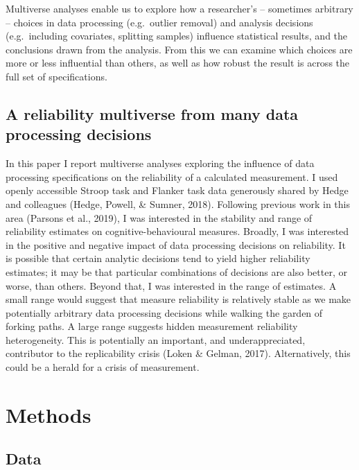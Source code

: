 \documentclass[english,man,floatsintext]{apa6}
\begin{document}
Multiverse analyses enable us to explore how a researcher's -- sometimes arbitrary -- choices in data processing (e.g.~outlier removal) and analysis decisions (e.g.~including covariates, splitting samples) influence statistical results, and the conclusions drawn from the analysis. From this we can examine which choices are more or less influential than others, as well as how robust the result is across the full set of specifications.

\hypertarget{a-reliability-multiverse-from-many-data-processing-decisions}{%
\subsection{A reliability multiverse from many data processing decisions}\label{a-reliability-multiverse-from-many-data-processing-decisions}}

In this paper I report multiverse analyses exploring the influence of data processing specifications on the reliability of a calculated measurement. I used openly accessible Stroop task and Flanker task data generously shared by Hedge and colleagues (Hedge, Powell, \& Sumner, 2018). Following previous work in this area (Parsons et al., 2019), I was interested in the stability and range of reliability estimates on cognitive-behavioural measures. Broadly, I was interested in the positive and negative impact of data processing decisions on reliability. It is possible that certain analytic decisions tend to yield higher reliability estimates; it may be that particular combinations of decisions are also better, or worse, than others. Beyond that, I was interested in the range of estimates. A small range would suggest that measure reliability is relatively stable as we make potentially arbitrary data processing decisions while walking the garden of forking paths. A large range suggests hidden measurement reliability heterogeneity. This is potentially an important, and underappreciated, contributor to the replicability crisis (Loken \& Gelman, 2017). Alternatively, this could be a herald for a crisis of measurement.

\hypertarget{methods}{%
\section{Methods}\label{methods}}

\hypertarget{data}{%
\subsection{Data}\label{data}}
\end{document}
